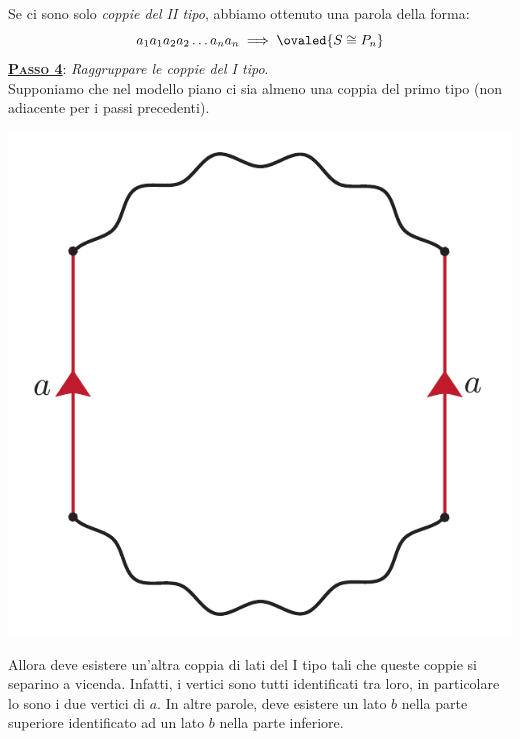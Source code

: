 \begin{demonstration}
Se ci sono solo \textit{coppie del II tipo}, abbiamo ottenuto una parola della forma:
\begin{equation}
	a_1a_1a_2a_2\ldots a_na_n \implies \ovaled{S\cong P_n}
\end{equation}
\textsc{\underline{\textbf{Passo 4}}}: \textit{Raggruppare le coppie del I tipo}.\\
Supponiamo che nel modello piano ci sia almeno una coppia del primo tipo (non adiacente per i passi precedenti).
	\begin{center}
	\includegraphics[trim=0cm 0cm 0cm 0cm, clip, scale=0.35]{images/cutandpastealgorithmstep4-1.pdf}
\end{center}
Allora deve esistere un'altra coppia di lati del I tipo tali che queste coppie si separino a vicenda. Infatti, i vertici sono tutti identificati tra loro, in particolare lo sono i due vertici di $a$. In altre parole, deve esistere un lato $b$ nella parte superiore identificato ad un lato $b$ nella parte inferiore.
	\begin{center}

\end{center}
\end{demonstration}
